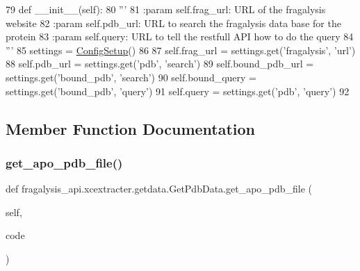 \begin{DoxyCode}
79     \textcolor{keyword}{def }\_\_init\_\_(self):
80         \textcolor{stringliteral}{'''}
81 \textcolor{stringliteral}{        :param self.frag\_url: URL of the fragalysis website}
82 \textcolor{stringliteral}{        :param self.pdb\_url: URL to search the fragalysis data base for the protein}
83 \textcolor{stringliteral}{        :param self.query: URL to tell the restfull API how to do the query}
84 \textcolor{stringliteral}{        '''}
85         settings = \hyperlink{namespacefragalysis__api_1_1xcglobalscripts_1_1set__config_a9b5445f82604ad45c1e85e2b07e4a317}{ConfigSetup}()
86 
87         self.frag\_url = settings.get(\textcolor{stringliteral}{'fragalysis'}, \textcolor{stringliteral}{'url'})
88         self.pdb\_url = settings.get(\textcolor{stringliteral}{'pdb'}, \textcolor{stringliteral}{'search'})
89         self.bound\_pdb\_url = settings.get(\textcolor{stringliteral}{'bound\_pdb'}, \textcolor{stringliteral}{'search'})
90         self.bound\_query = settings.get(\textcolor{stringliteral}{'bound\_pdb'}, \textcolor{stringliteral}{'query'})
91         self.query = settings.get(\textcolor{stringliteral}{'pdb'}, \textcolor{stringliteral}{'query'})
92 
\end{DoxyCode}


\subsection{Member Function Documentation}
\mbox{\label{classfragalysis__api_1_1xcextracter_1_1getdata_1_1_get_pdb_data_a1785640f7d8841b41773f04577065366}} 
\subsubsection{\texorpdfstring{get\+\_\+apo\+\_\+pdb\+\_\+file()}{get\_apo\_pdb\_file()}}
{\footnotesize\ttfamily def fragalysis\+\_\+api.\+xcextracter.\+getdata.\+Get\+Pdb\+Data.\+get\+\_\+apo\+\_\+pdb\+\_\+file (\begin{DoxyParamCaption}\item[{}]{self,  }\item[{}]{code }\end{DoxyParamCaption})}

